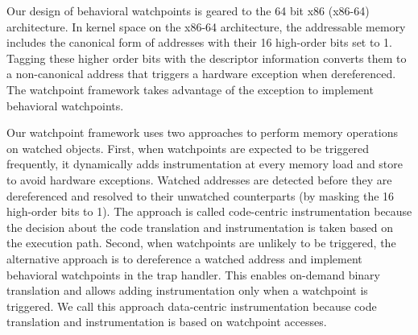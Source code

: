 Our design of behavioral watchpoints is geared to the 64 bit x86 (x86-64) architecture. In kernel space on the x86-64 architecture, the addressable memory includes the canonical form of addresses with their 16 high-order bits set to 1. Tagging these higher order bits with the descriptor information converts them to a non-canonical address that triggers a hardware exception when dereferenced. The watchpoint framework takes advantage of the exception to implement behavioral watchpoints.



Our watchpoint framework uses two approaches to perform memory operations on watched objects. First, when watchpoints are expected to be triggered frequently, it dynamically adds instrumentation at every memory load and store to avoid hardware exceptions. Watched addresses are detected before they are dereferenced and resolved to their unwatched counterparts (by masking the 16 high-order bits to 1). The approach is called code-centric instrumentation because the decision about the code translation and instrumentation is taken based on the execution path. 
Second, when watchpoints are unlikely to be triggered, the alternative approach is to dereference a watched address and implement behavioral watchpoints in the trap handler. This enables on-demand binary translation and allows adding instrumentation only when a watchpoint is triggered. We call this approach data-centric instrumentation because code translation and instrumentation is based on watchpoint accesses.


